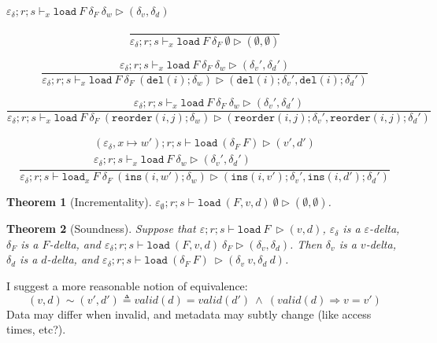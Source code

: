 \documentclass{report}
\theoremstyle{theorem}
\newtheorem{theorem}{Theorem}[section]
\begin{document}
$\boxed{\varepsilon_\delta ; r ; s \vdash_x \mathtt{load}~ F~ \delta_F~\delta_w \rhd (\delta_v,\delta_d)}$

\begin{displaymath}
	\frac{}
	{\varepsilon_\delta ; r ; s \vdash_x \mathtt{load}~F~ \delta_F ~\emptyset \rhd (\emptyset,\emptyset)}
\end{displaymath}

\begin{displaymath}
	\frac{
		\varepsilon_\delta ; r ; s \vdash_x \mathtt{load}~F~ \delta_F ~\delta_w \rhd (\delta_v',\delta_d')
	}
	{\varepsilon_\delta ; r ; s \vdash_x \mathtt{load}~F~ \delta_F ~(\mathtt{del}(i);\delta_w) \rhd (\mathtt{del}(i);\delta_v',\mathtt{del}(i);\delta_d')}
\end{displaymath}

\begin{displaymath}
	\frac{
		\varepsilon_\delta ; r ; s \vdash_x \mathtt{load}~F~ \delta_F ~\delta_w \rhd (\delta_v',\delta_d')
	}
	{\varepsilon_\delta ; r ; s \vdash_x \mathtt{load}~F~ \delta_F ~(\mathtt{reorder}(i,j);\delta_w) \rhd (\mathtt{reorder}(i,j);\delta_v',\mathtt{reorder}(i,j);\delta_d')}
\end{displaymath}

\begin{displaymath}
	\frac{\begin{array}{c}
		(\varepsilon_\delta,x \mapsto w') ; r ; s \vdash \mathtt{load}~ (\delta_F ~F) \rhd (v',d')\\
		\varepsilon_\delta ; r ; s \vdash_x \mathtt{load}~F~\delta_w \rhd (\delta_v',\delta_d')
	\end{array}}
	{\varepsilon_\delta ; r ; s \vdash \mathtt{load}_x~F~ \delta_F ~(\mathtt{ins}(i,w');\delta_w) \rhd (\mathtt{ins}(i,v');\delta_v',\mathtt{ins}(i,d');\delta_d')}
\end{displaymath}

\begin{theorem}[Incrementality]
	$\varepsilon_\emptyset ; r ; s \vdash \mathtt{load}~ (F,v,d)~ \emptyset \rhd (\emptyset,\emptyset)$.
\end{theorem}

\begin{theorem}[Soundness]
	Suppose that $\varepsilon ; r ; s \vdash \mathtt{load}~ F~ \rhd (v,d)$, $\varepsilon_\delta$ is a $\varepsilon$-delta, $\delta_F$ is a $F$-delta, and $\varepsilon_\delta ; r ; s \vdash \mathtt{load}~ (F,v,d)~ \delta_F \rhd (\delta_v,\delta_d)$.
	Then $\delta_v$ is a $v$-delta, $\delta_d$ is a $d$-delta, and $\varepsilon_\delta ; r ; s \vdash \mathtt{load}~ (\delta_F~F)~ \rhd (\delta_v~v,\delta_d~d)$.
\end{theorem}
	
I suggest a more reasonable notion of equivalence:
\begin{displaymath}
	(v,d) \sim (v',d') \triangleq valid(d)=valid(d') ~\wedge~ (valid(d) \Rightarrow v = v')
\end{displaymath}
Data may differ when invalid, and metadata may subtly change (like access times, etc?).
	
\end{document}
